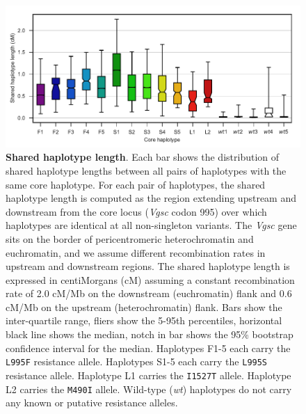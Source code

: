 \documentclass[a4paper,11pt,abstracton,hidelinks]{scrartcl}
\begin{document}
%
\begin{figure}[!b]
  \includegraphics[width=1.1\linewidth,center]{artwork/clusters_compare_pspd.pdf}
  \caption{\textbf{Shared haplotype length}. Each bar shows the distribution of shared haplotype lengths between all pairs of haplotypes with the same core haplotype. For each pair of haplotypes, the shared haplotype length is computed as the region extending upstream and downstream from the core locus (\textit{Vgsc} codon 995) over which haplotypes are identical at all non-singleton variants. The \textit{Vgsc} gene sits on the border of pericentromeric heterochromatin and euchromatin, and we assume different recombination rates in upstream and downstream regions. The shared haplotype length is expressed in centiMorgans (cM) assuming a constant recombination rate of 2.0 cM/Mb on the downstream (euchromatin) flank and 0.6 cM/Mb on the upstream (heterochromatin) flank. Bars show the inter-quartile range, fliers show the 5-95th percentiles, horizontal black line shows the median, notch in bar shows the 95\% bootstrap confidence interval for the median. Haplotypes F1-5 each carry the \texttt{L995F} resistance allele. Haplotypes S1-5 each carry the \texttt{L995S} resistance allele. Haplotype L1 carries the \texttt{I1527T} allele. Haplotype L2 carries the \texttt{M490I} allele. Wild-type (\textit{wt}) haplotypes do not carry any known or putative resistance alleles.}
  \label{fig:pspd}
\end{figure}
\end{document}
